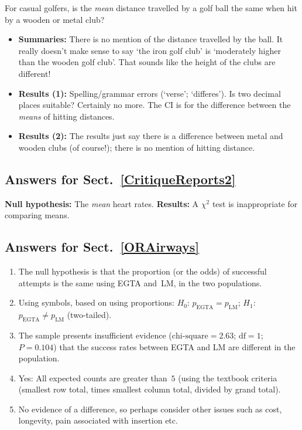 \documentclass[
  11pt,
  a4paper,
  krantz2]{krantz}
\makeatletter
\providecommand{\tightlist}{%
  \setlength{\itemsep}{0pt}\setlength{\parskip}{0pt}}
\renewenvironment{quote}%
{\begin{kframe}}
{\end{kframe}}
\newenvironment{kframe}{%
\medskip{}
\setlength{\fboxsep}{.8em}
 \def\at@end@of@kframe{}%
 \ifinner\ifhmode%
  \def\at@end@of@kframe{\end{minipage}}%
  \begin{minipage}{\columnwidth}%
 \fi\fi%
 \def\FrameCommand##1{\hskip\@totalleftmargin \hskip-\fboxsep
 \colorbox{shadecolor}{##1}\hskip-\fboxsep
     \hskip-\linewidth \hskip-\@totalleftmargin \hskip\columnwidth}%
 \MakeFramed {\advance\hsize-\width
   \@totalleftmargin\z@ \linewidth\hsize
   \@setminipage}}%
 {\par\unskip\endMakeFramed%
 \at@end@of@kframe}
\renewenvironment{quote}
               {\list{}{\vspace{-0.5em}\begin{kframe}\small%
                        \rightmargin   \leftmargin
                        \parsep        \z@ \@plus\p@}%
                \item\relax}
               {\end{kframe}\endlist}
\makeatother
\begin{document}
\begin{footnotesize}
\begin{quote}
For casual golfers, is the \emph{mean} distance travelled by a golf ball the same when hit by a wooden or metal club?
\end{quote}

\begin{itemize}
\tightlist
\item
  \textbf{Summaries:}
  There is no mention of the distance travelled by the ball.
  It really doesn't make sense to say `the iron golf club' is `moderately higher than the wooden golf club'.
  That sounds like the height of the clubs are different!
\item
  \textbf{Results (1):}
  Spelling/grammar errors (`verse'; `differes').
  Is two decimal places suitable? Certainly no more.
  The CI is for the difference between the \emph{means} of hitting distances.
\item
  \textbf{Results (2):}
  The results just say there is a difference between metal and wooden clubs (of course!); there is no mention of hitting distance.
\end{itemize}

\subsection*{Answers for Sect.~\ref{CritiqueReports2}}\label{answers-for-sect.-refcritiquereports2}

\textbf{Null hypothesis:} The \emph{mean} heart rates.
\textbf{Results:} A \(\chi^2\) test is inappropriate for comparing means.

\subsection*{Answers for Sect.~\ref{ORAirways}}\label{answers-for-sect.-reforairways}

\begin{enumerate}
\def\labelenumi{\arabic{enumi}.}
\tightlist
\item
  The null hypothesis is that the proportion (or the odds) of successful attempts is the same using EGTA and~LM, in the two populations.
\item
  Using symbols, based on using proportions: \(H_0\): \(p_{\text{EGTA}} = p_{\text{LM}}\); \(H_1\): \(p_{\text{EGTA}} \ne p_{\text{LM}}\) (two-tailed).
\item
  The sample presents insufficient evidence (\(\text{chi-square}=2.63\); \(\text{df}=1\); \(P=0.104\)) that the success rates between EGTA and LM are different in the population.
\item
  Yes: All expected counts are greater than~\(5\) (using the textbook criteria (smallest row total, times smallest column total, divided by grand total).
\item
  No evidence of a difference, so perhaps consider other issues such as cost, longevity, pain associated with insertion etc.
\end{enumerate}


\end{footnotesize}
\end{document}
